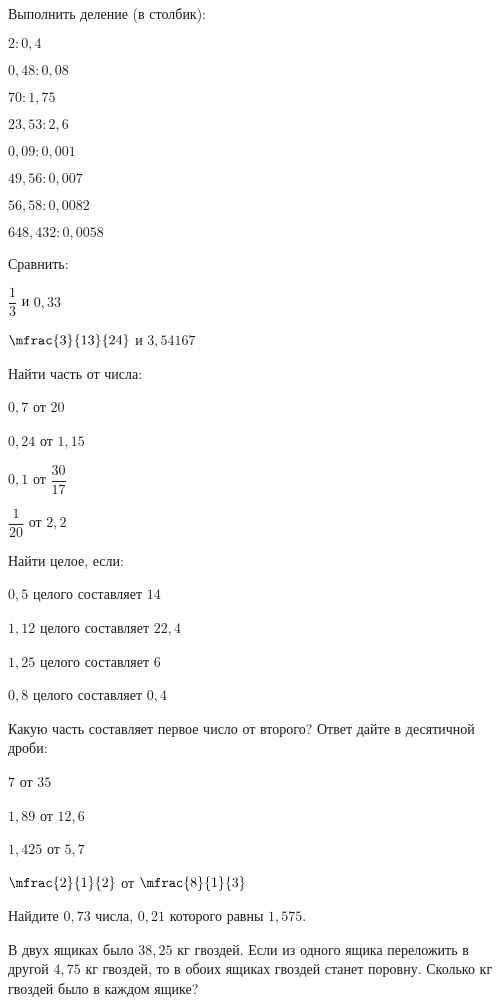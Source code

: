 %
\begin{class}[number=2]
	\begin{listofex}
		\item Выполнить деление (в столбик):
		\begin{enumcols}[itemcolumns=4]
			\item \( 2:0,4 \)
			\item \( 0,48:0,08 \)
			\item \( 70:1,75 \)
			\item \( 23,53:2,6 \)
			\item \( 0,09:0,001 \)
			\item \( 49,56:0,007 \)
			\item \( 56,58:0,0082 \)
			\item \( 648,432:0,0058 \)
		\end{enumcols}
		\item Сравнить:
		\begin{enumcols}[itemcolumns=2]
			\item \( \dfrac{1}{3} \) и \( 0,33 \)
			\item \( \mfrac{3}{13}{24} \) и \( 3,54167 \)
		\end{enumcols}
		\item Найти часть от числа:
		\begin{enumcols}[itemcolumns=4]
			\item \( 0,7 \) от \( 20 \)
			\item \( 0,24 \) от \( 1,15 \)
			\item \( 0,1 \) от \( \dfrac{30}{17} \)
			\item \( \dfrac{1}{20} \) от \( 2,2 \)
		\end{enumcols}
		\item Найти целое, если:
		\begin{enumcols}[itemcolumns=2]
			\item \( 0,5 \) целого составляет \( 14 \)
			\item \( 1,12 \) целого составляет \( 22,4 \)
			\item \( 1,25 \) целого составляет \( 6 \)
			\item \( 0,8 \) целого составляет \( 0,4 \)
		\end{enumcols}
		\item Какую часть составляет первое число от второго? Ответ дайте в десятичной дроби:
		\begin{enumcols}[itemcolumns=4]
			\item \( 7 \) от \( 35 \)
			\item \( 1,89 \) от \( 12,6 \)
			\item \( 1,425 \) от \( 5,7 \)
			\item \( \mfrac{2}{1}{2} \) от \( \mfrac{8}{1}{3} \)
		\end{enumcols}
		\item Найдите \( 0,73 \) числа, \( 0,21 \) которого равны \( 1,575 \).
		\item В двух ящиках было \( 38,25 \) кг гвоздей. Если из одного ящика переложить в другой \( 4,75 \) кг гвоздей, то в обоих ящиках гвоздей станет поровну. Сколько кг гвоздей было в каждом ящике?
	\end{listofex}
\end{class}
